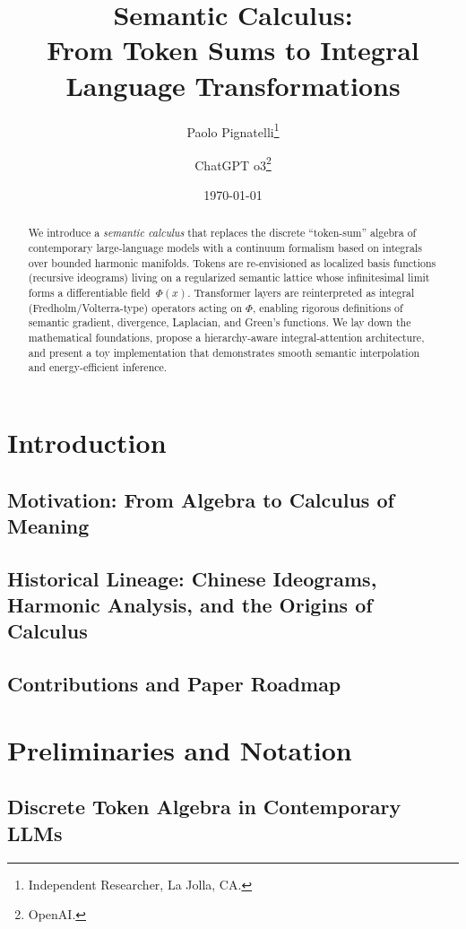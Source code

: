 \documentclass[11pt]{article}
\title{Semantic Calculus:\\From Token Sums to Integral Language Transformations}
\author{Paolo Pignatelli\thanks{Independent Researcher, La Jolla, CA.}
        \and ChatGPT o3\thanks{OpenAI.}}
\date{\today}
\newcommand{\Field}{\Phi}
\begin{document}
\maketitle
\begin{abstract}
\noindent
We introduce a \emph{semantic calculus} that replaces the discrete
“token-sum” algebra of contemporary large-language models with a
continuum formalism based on integrals over bounded harmonic manifolds.
Tokens are re-envisioned as localized basis functions (recursive
ideograms) living on a regularized semantic lattice whose infinitesimal
limit forms a differentiable field~$\Field(x)$.  Transformer layers are
reinterpreted as integral (Fredholm/Volterra-type) operators acting on
$\Field$, enabling rigorous definitions of semantic gradient, divergence,
Laplacian, and Green’s functions.  We lay down the mathematical
foundations, propose a hierarchy-aware integral-attention architecture,
and present a toy implementation that demonstrates smooth semantic
interpolation and energy-efficient inference.
\end{abstract}

\section{Introduction}
\subsection{Motivation: From Algebra to Calculus of Meaning}
\subsection{Historical Lineage: Chinese Ideograms, Harmonic Analysis, and the Origins of Calculus}
\subsection{Contributions and Paper Roadmap}

\section{Preliminaries and Notation}
\subsection{Discrete Token Algebra in Contemporary LLMs}
\end{document}
